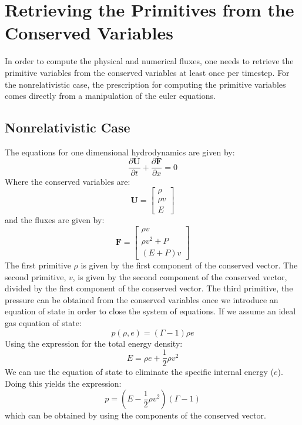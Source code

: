 \section{Retrieving the Primitives from the Conserved Variables}
In order to compute the physical and numerical fluxes, one needs to retrieve the primitive variables from the conserved variables at least once per timestep. For the nonrelativistic case, the prescription for computing the primitive variables comes directly from a manipulation of the euler equations. 
\subsection{Nonrelativistic Case}
The equations for one dimensional hydrodynamics are given by:
$$\frac{\partial \bm{U}}{\partial t}+\frac{\partial \bm{F}}{\partial x} = 0$$
Where the conserved variables are: 
$$\bm{U}= \begin{bmatrix} \rho \\ \rho v\\ E \end{bmatrix}$$
and the fluxes are given by:
$$\bm{F}=\begin{bmatrix} \rho v \\ \rho v^2 +P \\ (E+P)v \end{bmatrix}$$
The first primitive $\rho$ is given by the first component of the conserved vector. The second primitive, $v$, is given by the second component of the conserved vector, divided by the first component of the conserved vector. The third primitive, the pressure can be obtained from the conserved variables once we introduce an equation of state in order to close the system of equations. If we assume an ideal gas equation of state:
$$p(\rho,e)=(\Gamma-1)\rho e$$
Using the expression for the total energy density:
$$E=\rho e +\frac{1}{2}\rho v^2$$
We can use the equation of state to eliminate the specific internal energy ($e$). Doing this yields the expression:
$$p=\left(E-\frac{1}{2}\rho v^2\right)(\Gamma-1)$$
which can be obtained by using the components of the conserved vector. \\

